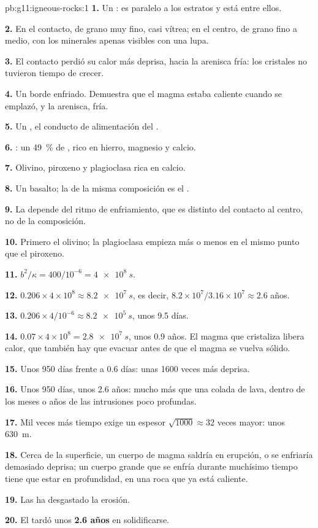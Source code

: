 \begin{solution}{pb:g11:igneous-rocks:1}
\textbf{1.} Un : es paralelo a los estratos y está entre ellos.

\textbf{2.} En el contacto, de grano muy fino, casi vítrea; en el centro, de
grano fino a medio, con los minerales apenas visibles con una lupa.

\textbf{3.} El contacto perdió su calor más deprisa, hacia la arenisca fría:
los cristales no tuvieron tiempo de crecer.

\textbf{4.} Un borde enfriado. Demuestra que el magma estaba caliente cuando
se emplazó, y la arenisca, fría.

\textbf{5.} Un , el conducto de alimentación del .

\textbf{6.} : un \qty{49}{\percent} de , rico en hierro,
magnesio y calcio.

\textbf{7.} Olivino, piroxeno y plagioclasa rica en calcio.

\textbf{8.} Un basalto; la  de la misma composición es el .

\textbf{9.} La  depende del ritmo de enfriamiento, que es distinto del
contacto al centro, no de la composición.

\textbf{10.} Primero el olivino; la plagioclasa empieza más o menos en el
mismo punto que el piroxeno.

\textbf{11.} $b^2/\kappa = 400/10^{-6} = \qty{4e8}{s}$.

\textbf{12.} $0.206 \times 4 \times 10^8 \approx \qty{8.2e7}{s}$, es decir,
$8.2 \times 10^7 / 3.16 \times 10^7 \approx 2.6$ años.

\textbf{13.} $0.206 \times 4/10^{-6} \approx \qty{8.2e5}{s}$, unos 9.5
días.

\textbf{14.} $0.07 \times 4 \times 10^8 = \qty{2.8e7}{s}$, unos 0.9 años. El
magma que cristaliza libera calor, que también hay que evacuar antes de que el
magma se vuelva sólido.

\textbf{15.} Unos 950 días frente a 0.6 días: unas 1600 veces más deprisa.

\textbf{16.} Unos 950 días, unos 2.6 años: mucho más que una colada de
lava, dentro de los meses o años de las intrusiones poco profundas.

\textbf{17.} Mil veces más tiempo exige un espesor $\sqrt{1000} \approx
32$
veces mayor: unos \qty{630}{m}.

\textbf{18.} Cerca de la superficie, un cuerpo de magma saldría en erupción, o
se enfriaría demasiado deprisa; un cuerpo grande que se enfría durante muchísimo
tiempo tiene que estar en profundidad, en una roca que ya está caliente.

\textbf{19.} Las ha desgastado la erosión.

\textbf{20.} El  tardó unos \textbf{2.6 años} en solidificarse.
\end{solution}
